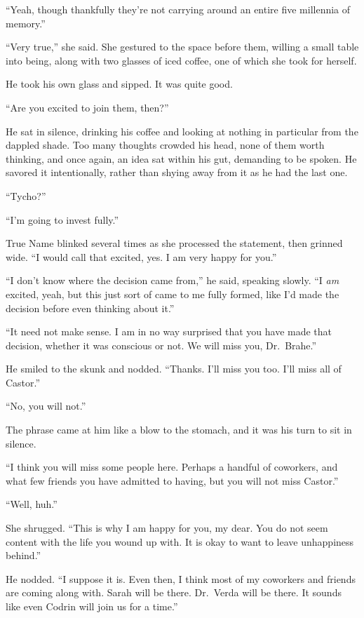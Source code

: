 ``Yeah, though thankfully they're not carrying around an entire five millennia of memory.''

``Very true,'' she said. She gestured to the space before them, willing a small table into being, along with two glasses of iced coffee, one of which she took for herself.

He took his own glass and sipped. It was quite good.

``Are you excited to join them, then?''

He sat in silence, drinking his coffee and looking at nothing in particular from the dappled shade. Too many thoughts crowded his head, none of them worth thinking, and once again, an idea sat within his gut, demanding to be spoken. He savored it intentionally, rather than shying away from it as he had the last one.

``Tycho?''

``I'm going to invest fully.''

True Name blinked several times as she processed the statement, then grinned wide. ``I would call that excited, yes. I am very happy for you.''

``I don't know where the decision came from,'' he said, speaking slowly. ``I \emph{am} excited, yeah, but this just sort of came to me fully formed, like I'd made the decision before even thinking about it.''

``It need not make sense. I am in no way surprised that you have made that decision, whether it was conscious or not. We will miss you, Dr.~Brahe.''

He smiled to the skunk and nodded. ``Thanks. I'll miss you too. I'll miss all of Castor.''

``No, you will not.''

The phrase came at him like a blow to the stomach, and it was his turn to sit in silence.

``I think you will miss some people here. Perhaps a handful of coworkers, and what few friends you have admitted to having, but you will not miss Castor.''

``Well, huh.''

She shrugged. ``This is why I am happy for you, my dear. You do not seem content with the life you wound up with. It is okay to want to leave unhappiness behind.''

He nodded. ``I suppose it is. Even then, I think most of my coworkers and friends are coming along with. Sarah will be there. Dr.~Verda will be there. It sounds like even Codrin will join us for a time.''

